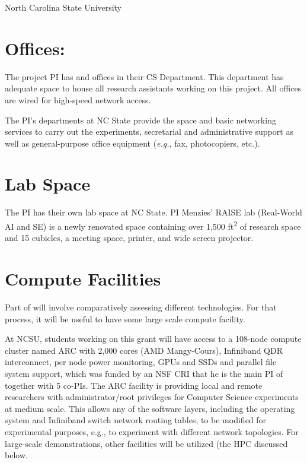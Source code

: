 \documentclass{NSF}
\newcommand{\IT}{{\sffamily {\em MASS~CONFUSION}}}
\begin{document}
\begin{Facilities}{North Carolina State University}

\section*{Offices:}
The project PI has
and offices in their   CS Department.  This
department
has adequate space to house all research assistants
working on this project. All offices are wired for high-speed network
access.

The PI's departments at  NC State provide the space and basic networking services to
carry out the experiments, secretarial and administrative support as
well as general-purpose office equipment ({\em e.g.}, fax, photocopiers,
etc.).

\section*{Lab Space}
The PI has their own lab space at   NC State.
PI  Menzies' RAISE lab (Real-World 
AI and SE) is a newly renovated space 
containing over 1,500 ft\textsuperscript{2} of research space and 
15 cubicles, a meeting space, printer, and wide screen projector. 

\section*{Compute Facilities}
Part of {\IT} will involve comparatively assessing different 
technologies.   For that process, it will be useful to have some large scale compute facility.
 
 At NCSU, students working on this grant will have access to  a 108-node compute cluster named ARC with 
2,000 cores (AMD Mangy-Cours), Infiniband QDR interconnect, per node
power monitoring, GPUs and SSDs and parallel file system support,
which was funded by an NSF CRI that he is the main PI of together with
5 co-PIs.  
The ARC facility is providing local and remote researchers with
administrator/root privileges for Computer Science experiments at
medium scale. This allows any of the software layers, including the
operating system and Infiniband switch network routing tables, to be
modified for experimental purposes, e.g., to experiment with different
network topologies.  For large-scale demonstrations, other 
facilities will be utilized (the HPC discussed below.



\end{Facilities}
\end{document}
